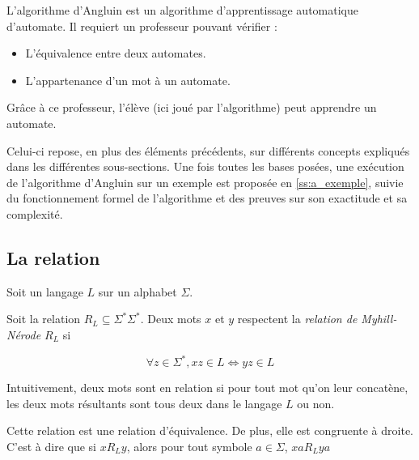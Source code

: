 L'algorithme d'Angluin est un algorithme d'apprentissage automatique d'automate. Il requiert un professeur pouvant vérifier :
\begin{itemize}
	\item L'équivalence entre deux automates.
	\item L'appartenance d'un mot à un automate.
\end{itemize}
Grâce à ce professeur, l'élève (ici joué par l'algorithme) peut apprendre un automate.

Celui-ci repose, en plus des éléments précédents, sur différents concepts expliqués dans les différentes sous-sections. Une fois toutes les bases posées, une exécution de l'algorithme d'Angluin sur un exemple est proposée en \ref{ss:a_exemple}, suivie du fonctionnement formel de l'algorithme et des preuves sur son exactitude et sa complexité.



\subsection{La relation \rl}

Soit un langage $L$ sur un alphabet $\Sigma$.

Soit la relation $R_L\subseteq\Sigma^*\Sigma^*$. Deux mots $x$ et $y$ respectent la \emph{relation de Myhill-Nérode $R_L$} si

$$\forall z \in \Sigma^*, xz \in L \Leftrightarrow yz \in L$$

Intuitivement, deux mots sont en relation si pour tout mot qu'on leur concatène, les deux mots résultants sont tous deux dans le langage $L$ ou non.

\begin{lemma}
	Cette relation est une relation d'équivalence. De plus, elle est congruente à droite. C'est à dire que si $xR_Ly$, alors pour tout symbole $a \in \Sigma$, $xaR_Lya$
\end{lemma}

